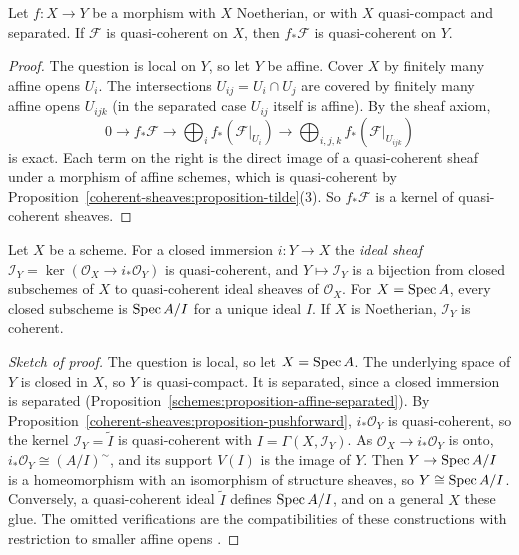 \begin{proposition}\label{coherent-sheaves:proposition-pushforward}
Let $f \colon X \to Y$ be a morphism with $X$ Noetherian, or with $X$ quasi-compact and separated. If $\mathcal{F}$ is quasi-coherent on $X$, then $f_*\mathcal{F}$ is
quasi-coherent on $Y$.
\end{proposition}

\begin{proof}
The question is local on $Y$, so let $Y$ be affine. Cover $X$ by finitely many affine opens $U_i$. The intersections $U_{ij} = U_i \cap U_j$ are covered by
finitely many affine opens $U_{ijk}$ (in the separated case $U_{ij}$ itself is affine). By the sheaf axiom,
\[
0 \to f_*\mathcal{F} \to \bigoplus_if_*(\mathcal{F}|_{U_i}) \to \bigoplus_{i,j,k}f_*(\mathcal{F}|_{U_{ijk}})
\]
is exact. Each term on the right is the direct image of a quasi-coherent sheaf under a morphism of affine schemes, which is quasi-coherent by
Proposition~\ref{coherent-sheaves:proposition-tilde}(3). So $f_*\mathcal{F}$ is a kernel of quasi-coherent sheaves.
\end{proof}

\begin{proposition}\label{coherent-sheaves:proposition-closed-subschemes}
Let $X$ be a scheme. For a closed immersion $i \colon Y \to X$ the \emph{ideal sheaf} $\mathcal{I}_Y = \ker(\mathcal{O}_X \to i_*\mathcal{O}_Y)$ is quasi-coherent,
and $Y \mapsto \mathcal{I}_Y$ is a bijection from closed subschemes of $X$ to quasi-coherent ideal sheaves of $\mathcal{O}_X$. For $X = \operatorname{Spec} A$, every closed
subscheme is $\operatorname{Spec} A/I$ for a unique ideal $I$. If $X$ is Noetherian, $\mathcal{I}_Y$ is coherent.
\end{proposition}

\begin{proof}[Sketch of proof]
The question is local, so let $X = \operatorname{Spec} A$. The underlying space of $Y$ is closed in $X$, so $Y$ is quasi-compact. It is separated, since a closed immersion is
separated (Proposition~\ref{schemes:proposition-affine-separated}). By Proposition~\ref{coherent-sheaves:proposition-pushforward}, $i_*\mathcal{O}_Y$ is
quasi-coherent, so the kernel $\mathcal{I}_Y = \widetilde I$ is quasi-coherent with $I = \Gamma(X, \mathcal{I}_Y)$. As $\mathcal{O}_X \to i_*\mathcal{O}_Y$ is onto,
$i_*\mathcal{O}_Y \cong (A/I)^\sim$, and its support $V(I)$ is the image of $Y$. Then $Y \to \operatorname{Spec} A/I$ is a homeomorphism with an isomorphism of structure
sheaves, so $Y \cong \operatorname{Spec} A/I$. Conversely, a quasi-coherent ideal $\widetilde I$ defines $\operatorname{Spec} A/I$, and on a general $X$ these glue. The omitted
verifications are the compatibilities of these constructions with restriction to smaller affine opens \cite[Corollary II.5.10]{hartshorne-ag}.
\end{proof}

